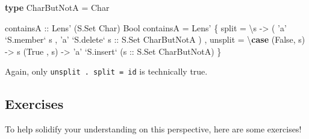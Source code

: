 \documentclass[]{article}
\newenvironment{Shaded}{}{}
\newcommand{\CharTok}[1]{\textcolor[rgb]{0.25,0.44,0.63}{#1}}
\newcommand{\DataTypeTok}[1]{\textcolor[rgb]{0.56,0.13,0.00}{#1}}
\newcommand{\FunctionTok}[1]{\textcolor[rgb]{0.02,0.16,0.49}{#1}}
\newcommand{\KeywordTok}[1]{\textcolor[rgb]{0.00,0.44,0.13}{\textbf{#1}}}
\newcommand{\NormalTok}[1]{#1}
\newcommand{\OtherTok}[1]{\textcolor[rgb]{0.00,0.44,0.13}{#1}}
\begin{document}
\begin{enumerate}
\begin{Shaded}
\begin{Highlighting}[]
\KeywordTok{type} \DataTypeTok{CharButNotA} \FunctionTok{=} \DataTypeTok{Char}

\OtherTok{containsA ::} \DataTypeTok{Lens'}\NormalTok{ (}\DataTypeTok{S.Set} \DataTypeTok{Char}\NormalTok{) }\DataTypeTok{Bool}
\NormalTok{containsA }\FunctionTok{=} \DataTypeTok{Lens'}
\NormalTok{    \{ split   }\FunctionTok{=}\NormalTok{ \textbackslash{}s }\OtherTok{->}
\NormalTok{        ( }\CharTok{'a'} \OtherTok{`S.member`}\NormalTok{ s}
\NormalTok{        , }\CharTok{'a'} \OtherTok{`S.delete` s      ::} \DataTypeTok{S.Set} \DataTypeTok{CharButNotA}
\NormalTok{        )}
\NormalTok{    , unsplit }\FunctionTok{=}\NormalTok{ \textbackslash{}}\KeywordTok{case}
\NormalTok{        (}\DataTypeTok{False}\NormalTok{, s) }\OtherTok{->}\NormalTok{ s}
\NormalTok{        (}\DataTypeTok{True}\NormalTok{ , s) }\OtherTok{->} \CharTok{'a'} \OtherTok{`S.insert`}\NormalTok{ (}\OtherTok{s ::} \DataTypeTok{S.Set} \DataTypeTok{CharButNotA}\NormalTok{)}
\NormalTok{    \}}
\end{Highlighting}
\end{Shaded}

  Again, only \texttt{unsplit\ .\ split\ =\ id} is technically true.
\end{enumerate}

\hypertarget{exercises}{%
\subsection{Exercises}\label{exercises}}

To help solidify your understanding on this perspective, here are some
exercises!
\end{document}
